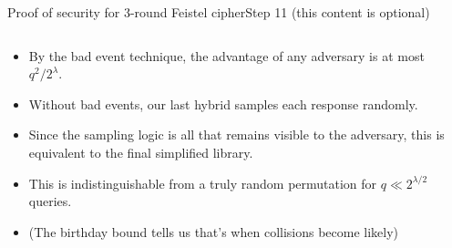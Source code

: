 \documentclass[aspectratio=169, lualatex, handout]{beamer}
\begin{document}
	\begin{frame}{Proof of security for 3-round Feistel cipher}{Step 11  (this content is optional)}
		\begin{columns}[c]
			\begin{column}{0.6\textwidth}
				\begin{itemize}[<+->]
					\item By the bad event technique, the advantage of any adversary is at most $q^2/2^{\lambda}$.
					\item Without bad events, our last hybrid samples each response randomly.
					\item Since the sampling logic is all that remains visible to the adversary, this is equivalent to the final simplified library.
					\item This is indistinguishable from a truly random permutation for $q \ll 2^{\lambda/2}$ queries.
					\item (The birthday bound tells us that's when collisions become likely)
				\end{itemize}
			\end{column}
			\begin{column}{0.4\textwidth}
				\vspace{-1.5cm}
				\begin{center}
				\end{center}
			\end{column}
		\end{columns}
	\end{frame}
\end{document}
